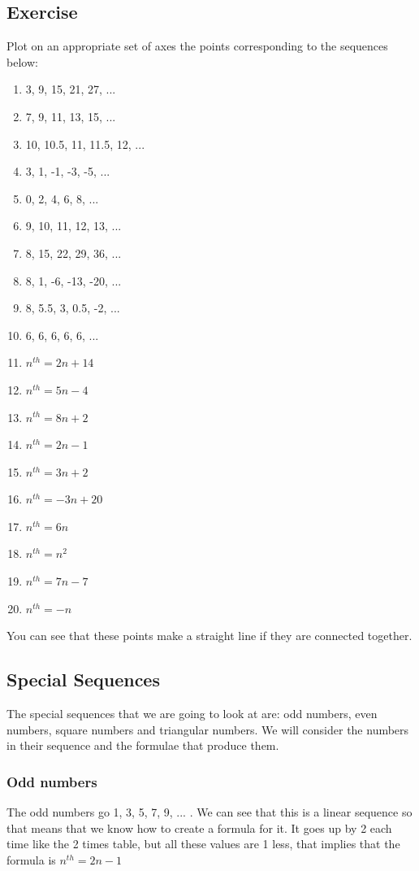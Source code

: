 \subsection{Exercise}
Plot on an appropriate set of axes the points corresponding to the sequences below:
\begin{enumerate}
	\item 3, 9, 15, 21, 27, ...
	\item 7, 9, 11, 13, 15, ...
	\item 10, 10.5, 11, 11.5, 12, ...
	\item 3, 1, -1, -3, -5, ...
	\item 0, 2, 4, 6, 8, ...
	\item 9, 10, 11, 12, 13, ...
	\item 8, 15, 22, 29, 36, ...
	\item 8, 1, -6, -13, -20, ...
	\item 8, 5.5, 3, 0.5, -2, ...
	\item 6, 6, 6, 6, 6, ...
	\item $n^{th}=2n+14$
	\item $n^{th}=5n-4$
	\item $n^{th}=8n+2$
	\item $n^{th}=2n-1$
	\item $n^{th}=3n+2$
	\item $n^{th}=-3n+20$
	\item $n^{th}=6n$
	\item $n^{th}=n^2$
	\item $n^{th}=7n-7$
	\item $n^{th}=-n$
\end{enumerate}

You can see that these points make a straight line if they are connected together.
\subsection{Special Sequences}
The special sequences that we are going to look at are: odd numbers, even numbers, square numbers and triangular numbers.  We will consider the numbers in their sequence and the formulae that produce them.

\subsubsection{Odd numbers}
The odd numbers go 1, 3, 5, 7, 9, ... . We can see that this is a linear sequence so that means that we know how to create a formula for it.  It goes up by 2 each time like the 2 times table, but all these values are 1 less, that implies that the formula is $n^{th}=2n-1$


